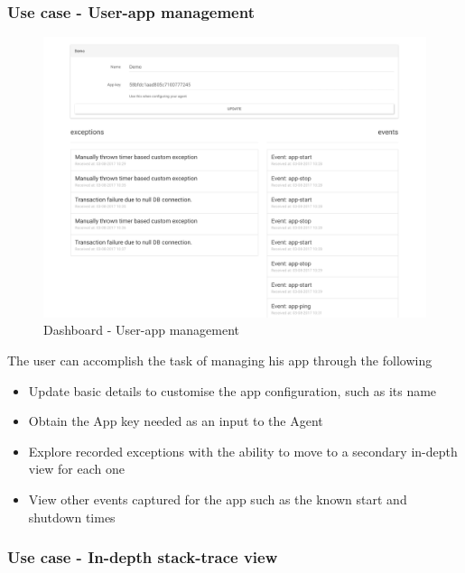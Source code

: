 \subsubsection{Use case - User-app management}

\begin{figure}[H]
  \centering
    \includegraphics[width=\textwidth]{dashboard-app.png} 
  \caption[Dashboard - User-app management]{Dashboard - User-app management}
\end{figure}

The user can accomplish the task of managing his app through the following
\begin{itemize}
  \item Update basic details to customise the app configuration, such as its name
  \item Obtain the App key needed as an input to the Agent
  \item Explore recorded exceptions with the ability to move to a secondary in-depth view for each one
  \item View other events captured for the app such as the known start and shutdown times
\end{itemize}



\subsubsection{Use case - In-depth stack-trace view}

